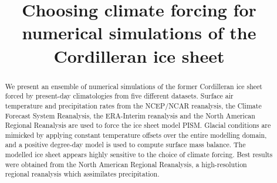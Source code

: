 \documentclass[tc, ms, noauthor]{copernicus}
\begin{document}
\title{Choosing climate forcing for numerical simulations of the Cordilleran ice sheet}


\received{}
\pubdiscuss{}
\revised{}
\accepted{}
\published{}

\maketitle

\begin{abstract}
We present an ensemble of numerical simulations of the former Cordilleran ice sheet forced by present-day climatologies from five different datasets. Surface air temperature and precipitation rates from the NCEP/NCAR reanalysis, the Climate Forecast System Reanalysis, the ERA-Interim reanalysis and the North American Regional Reanalysis are used to force the ice sheet model PISM. Glacial conditions are mimicked by applying constant temperature offsets over the entire modelling domain, and a positive degree-day model is used to compute surface mass balance. The modelled ice sheet appears highly sensitive to the choice of climate forcing. Best results were obtained from the North American Regional Reanalysis, a high-resolution regional reanalysis which assimilates precipitation.
\end{abstract}



%
%
%

\conclusions  %
\label{sec:conclusion}




\end{document}
